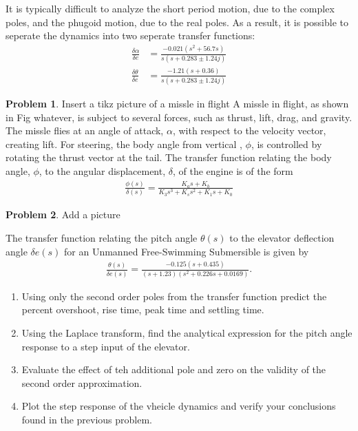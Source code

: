 \documentclass[10pt]{article}
\theoremstyle{definition}
\newtheorem{prob}{Problem}[section]
\newenvironment{subprob}%
{\renewcommand{\theenumi}{\alph{enumi}}\renewcommand{\labelenumi}{(\theenumi)}\begin{enumerate}}%
{\end{enumerate}}%
\begin{document}
It is typically difficult to analyze the short period motion, due to the complex poles, and the phugoid motion, due to the real poles. 
As a result, it is possible to seperate the dynamics into two seperate transfer functions:
\begin{align}
    \frac{\delta \alpha}{\delta e} &= \frac{-0.021 (s^2 + 56.7 s)}{s(s+0.283 \pm 1.24 j)} \\
    \frac{\delta \theta}{\delta e} &= \frac{-1.21 (s + 0.36)}{s(s+0.283 \pm 1.24 j)}
\end{align}

\begin{prob}
    Insert a tikz picture of a missle in flight
    A missle in flight, as shown in Fig whatever, is subject to several forces, such as thrust, lift, drag, and gravity. 
    The missle flies at an angle of attack, \( \alpha \), with respect to the velocity vector, creating lift.
    For steering, the body angle from vertical , \( \phi\), is controlled by rotating the thrust vector at the tail.
    The transfer function relating the body angle, \( \phi\), to the angular displacement, \( \delta \), of the engine is of the form
    \begin{align}
        \frac{\phi(s)}{\delta (s)} = \frac{K_a s + K_b}{K_3 s^3 + K_s s^2 + K_1 s + K_0}
    \end{align}
\end{prob}

\begin{prob}
    Add a picture

    The transfer function relating the pitch angle \( \theta (s) \) to the elevator deflection angle \( \delta e (s) \) for an Unmanned Free-Swimming Submersible is given by
    \begin{align}
        \frac{\theta (s) }{\delta e(s)} = \frac{-0.125 (s + 0.435)}{(s+1.23)(s^2 + 0.226 s + 0.0169)} .
    \end{align}

    \begin{subprob}
    \item Using only the second order poles from the transfer function predict the percent overshoot, rise time, peak time and settling time.
    \item Using the Laplace transform, find the analytical expression for the pitch angle response to a step input of the elevator.
    \item Evaluate the effect of teh additional pole and zero on the validity of the second order approximation.
    \item Plot the step response of the vheicle dynamics and verify your conclusions found in the previous problem.
    \end{subprob}
\end{prob}
\end{document}
